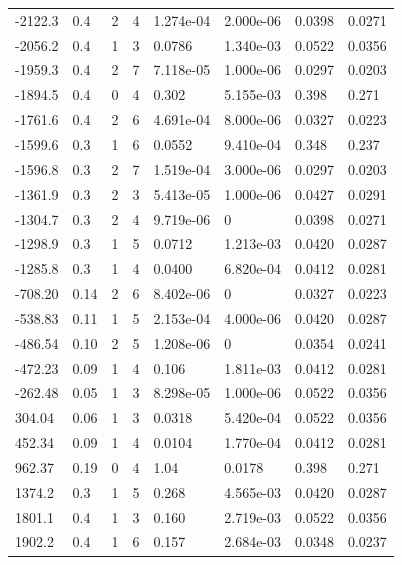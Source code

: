 \documentclass[preview]{standalone}
\begin{document}
{{\begin{tabular}{L{1.2cm}C{1.2cm} C{0.3cm}C{0.5cm} C{1.4cm}C{1.4cm} C{1.4cm}C{1.4cm}}
  -2122.3  &   0.4  & 2     &  4 &  1.274e-04  & 2.000e-06  & 0.0398 &  0.0271   \\ 
  -2056.2  &   0.4  & 1     &  3 &  0.0786  & 1.340e-03  & 0.0522 &  0.0356   \\ 
  -1959.3  &   0.4  & 2     &  7 &  7.118e-05  & 1.000e-06  & 0.0297 &  0.0203   \\ 
  -1894.5  &   0.4  & 0     &  4 &  0.302  & 5.155e-03  & 0.398 &  0.271   \\ 
  -1761.6  &   0.4  & 2     &  6 &  4.691e-04  & 8.000e-06  & 0.0327 &  0.0223   \\ 
  -1599.6  &   0.3  & 1     &  6 &  0.0552  & 9.410e-04  & 0.348 &  0.237   \\ 
  -1596.8  &   0.3  & 2     &  7 &  1.519e-04  & 3.000e-06  & 0.0297 &  0.0203   \\ 
  -1361.9  &   0.3  & 2     &  3 &  5.413e-05  & 1.000e-06  & 0.0427 &  0.0291   \\ 
  -1304.7  &   0.3  & 2     &  4 &  9.719e-06  & 0  & 0.0398 &  0.0271   \\ 
  -1298.9  &   0.3  & 1     &  5 &  0.0712  & 1.213e-03  & 0.0420 &  0.0287   \\ 
  -1285.8  &   0.3  & 1     &  4 &  0.0400  & 6.820e-04  & 0.0412 &  0.0281   \\ 
  -708.20  &  0.14  & 2     &  6 &  8.402e-06  & 0  & 0.0327 &  0.0223   \\ 
  -538.83  &  0.11  & 1     &  5 &  2.153e-04  & 4.000e-06  & 0.0420 &  0.0287   \\ 
  -486.54  &  0.10  & 2     &  5 &  1.208e-06  & 0  & 0.0354 &  0.0241   \\ 
  -472.23  &  0.09  & 1     &  4 &  0.106  & 1.811e-03  & 0.0412 &  0.0281   \\ 
  -262.48  &  0.05  & 1     &  3 &  8.298e-05  & 1.000e-06  & 0.0522 &  0.0356   \\ 
  304.04  &  0.06  & 1     &  3 &  0.0318  & 5.420e-04  & 0.0522 &  0.0356   \\ 
  452.34  &  0.09  & 1     &  4 &  0.0104  & 1.770e-04  & 0.0412 &  0.0281   \\ 
  962.37  &  0.19  & 0     &  4 &  1.04  & 0.0178  & 0.398 &  0.271   \\ 
  1374.2  &   0.3  & 1     &  5 &  0.268  & 4.565e-03  & 0.0420 &  0.0287   \\ 
  1801.1  &   0.4  & 1     &  3 &  0.160  & 2.719e-03  & 0.0522 &  0.0356   \\ 
  1902.2  &   0.4  & 1     &  6 &  0.157  & 2.684e-03  & 0.0348 &  0.0237   \\ 

\end{tabular}}}
\end{document}
